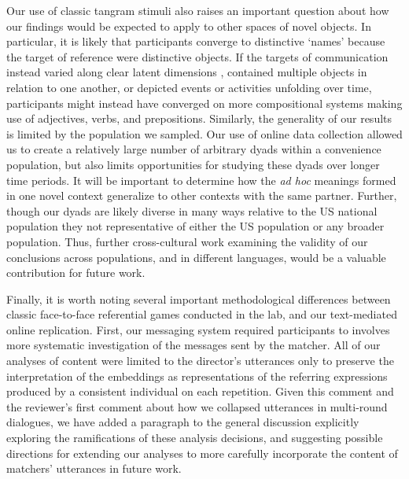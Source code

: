 \documentclass[alpha-refs]{wiley-article}
\begin{document}
Our use of classic tangram stimuli also raises an important question about how our findings would be expected to apply to other spaces of novel objects.
In particular, it is likely that participants converge to distinctive `names' because the target of reference were distinctive objects.
If the targets of communication instead varied along clear latent dimensions \citep[e.g.][]{nolle2018emergence}, contained multiple objects in relation to one another, or depicted events or activities unfolding over time, participants might instead have converged on more compositional systems making use of adjectives, verbs, and prepositions.
Similarly, the generality of our results is limited by the population we sampled.
Our use of online data collection allowed us to create a relatively large number of arbitrary dyads within a convenience population, but also limits opportunities for studying these dyads over longer time periods.
It will be important to determine how the \emph{ad hoc} meanings formed in one novel context generalize to other contexts with the same partner.
Further, though our dyads are likely diverse in many ways relative to the US national population \citep{levay2016demographic} they not representative of either the US population or any broader population.
Thus, further cross-cultural work examining the validity of our conclusions across populations, and in different languages, would be a valuable contribution for future work.

Finally, it is worth noting several important methodological differences between classic face-to-face referential games conducted in the lab, and our text-mediated online replication. 
First, our messaging system required participants to 
involves more systematic investigation of the messages sent by the matcher. 
All of our analyses of content were limited to the director’s utterances only to preserve the interpretation of the embeddings as representations of the referring expressions produced by a consistent individual on each repetition. Given this comment and the reviewer’s first comment about how we collapsed utterances in multi-round dialogues, we have added a paragraph to the general discussion explicitly exploring the ramifications of these analysis decisions, and suggesting possible directions for extending our analyses to more carefully incorporate the content of matchers’ utterances in future work. 
\end{document}
